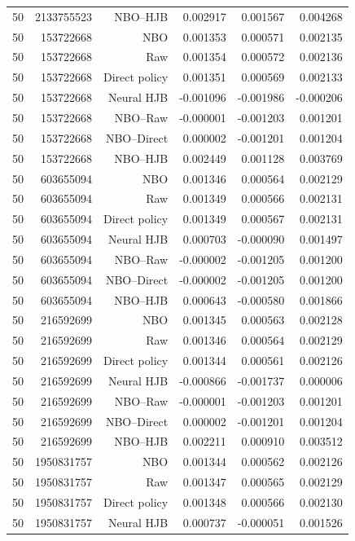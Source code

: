 \begin{longtable}{lrrrrr}
50 & 2133755523 & NBO--HJB & 0.002917 & 0.001567 & 0.004268 \\
50 & 153722668 & NBO & 0.001353 & 0.000571 & 0.002135 \\
50 & 153722668 & Raw & 0.001354 & 0.000572 & 0.002136 \\
50 & 153722668 & Direct policy & 0.001351 & 0.000569 & 0.002133 \\
50 & 153722668 & Neural HJB & -0.001096 & -0.001986 & -0.000206 \\
50 & 153722668 & NBO--Raw & -0.000001 & -0.001203 & 0.001201 \\
50 & 153722668 & NBO--Direct & 0.000002 & -0.001201 & 0.001204 \\
50 & 153722668 & NBO--HJB & 0.002449 & 0.001128 & 0.003769 \\
50 & 603655094 & NBO & 0.001346 & 0.000564 & 0.002129 \\
50 & 603655094 & Raw & 0.001349 & 0.000566 & 0.002131 \\
50 & 603655094 & Direct policy & 0.001349 & 0.000567 & 0.002131 \\
50 & 603655094 & Neural HJB & 0.000703 & -0.000090 & 0.001497 \\
50 & 603655094 & NBO--Raw & -0.000002 & -0.001205 & 0.001200 \\
50 & 603655094 & NBO--Direct & -0.000002 & -0.001205 & 0.001200 \\
50 & 603655094 & NBO--HJB & 0.000643 & -0.000580 & 0.001866 \\
50 & 216592699 & NBO & 0.001345 & 0.000563 & 0.002128 \\
50 & 216592699 & Raw & 0.001346 & 0.000564 & 0.002129 \\
50 & 216592699 & Direct policy & 0.001344 & 0.000561 & 0.002126 \\
50 & 216592699 & Neural HJB & -0.000866 & -0.001737 & 0.000006 \\
50 & 216592699 & NBO--Raw & -0.000001 & -0.001203 & 0.001201 \\
50 & 216592699 & NBO--Direct & 0.000002 & -0.001201 & 0.001204 \\
50 & 216592699 & NBO--HJB & 0.002211 & 0.000910 & 0.003512 \\
50 & 1950831757 & NBO & 0.001344 & 0.000562 & 0.002126 \\
50 & 1950831757 & Raw & 0.001347 & 0.000565 & 0.002129 \\
50 & 1950831757 & Direct policy & 0.001348 & 0.000566 & 0.002130 \\
50 & 1950831757 & Neural HJB & 0.000737 & -0.000051 & 0.001526 \\

\end{longtable}
